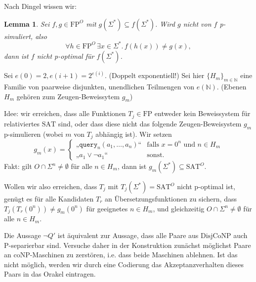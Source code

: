 \documentclass[nofonts]{uebung}
\newtheorem{lemma}[theorem]{Lemma}
\def\P{\ensuremath{\mathrm{P}}}
\def\FP{\ensuremath{\mathrm{FP}}}
\def\DisjCoNP{\ensuremath{\mathrm{DisjCoNP}}}
\begin{document}
Nach Dingel wissen wir:
\begin{lemma}
    Sei $f, g\in\FP^O$ mit $g(\Sigma^*)\subseteq f(\Sigma^*)$.  Wird $g$ nicht von $f$ p-simuliert, also
    \[ \forall h\in\FP^O\,\exists x\in\Sigma^*.\, f(h(x)) \neq g(x), \]
    dann ist $f$ nicht p-optimal für $f(\Sigma^*)$.
\end{lemma}

Sei $e(0)=2, e(i+1)=2^{e(i)}$. (Doppelt exponentiell!)
Sei hier $\{H_m\}_{m\in\mathbb N}$ eine Familie von paarweise disjunkten, unendlichen Teilmengen von $e(\mathbb N)$. (Ebenen $H_m$ gehören zum Zeugen-Beweissytem $g_m$)

Idee: wir erreichen, dass alle Funktionen $T_j\in\FP$ entweder kein Beweissystem für relativiertes $\mathrm{SAT}$ sind, oder dass diese nicht das folgende Zeugen-Beweisystem $g_m$ p-simulieren (wobei $m$ von $T_j$ abhängig ist).
Wir setzen
\[ g_m(x) = \begin{cases} „\texttt{query}_n(a_1, \dots, a_n)“ & \text{falls $x=0^n$ und $n\in H_m$} \\ „a_1 \lor \neg a_1“ & \text{sonst}. \end{cases}\]
Fakt: gilt $O\cap \Sigma^n\neq \emptyset$ für alle $n\in H_m$, dann ist $g_m(\Sigma^*)\subseteq \mathrm{SAT}^O$.

Wollen wir also erreichen, dass $T_j$ mit $T_j(\Sigma^*)=\mathrm{SAT}^O$ nicht p-optimal ist, genügt es für alle Kandidaten $T_r$ an Übersetzungsfunktionen zu sichern, dass $T_j(T_r(0^n))\neq g_m(0^n)$ für geeignetes $n\in H_m$, und gleichzeitig $O\cap \Sigma^n\neq \emptyset$ für alle $n\in H_m$.

Die Aussage $\neg Q'$ ist äquivalent zur Aussage, dass alle Paare aus $\DisjCoNP$ auch \P-separierbar sind.
Versuche daher in der Konstruktion zunächst möglichst Paare an coNP-Maschinen zu zerstören, i.e. dass beide Maschinen ablehnen.
Ist das nicht möglich, werden wir durch eine Codierung das Akzeptanzverhalten dieses Paars in das Orakel eintragen.
\end{document}
